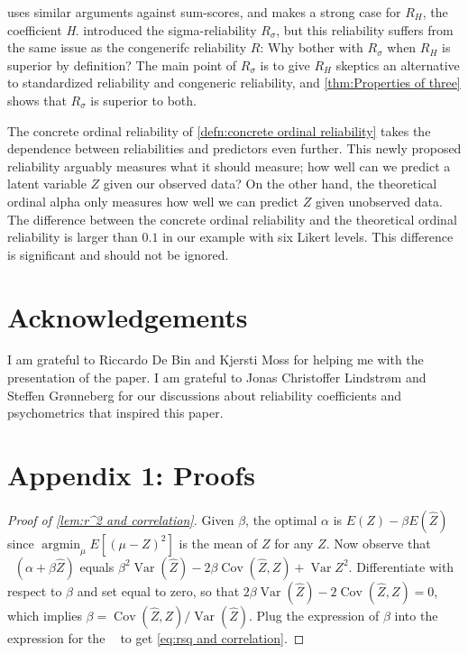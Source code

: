 \documentclass[twoside]{article}
\DeclareMathOperator{\Var}{Var}
\DeclareMathOperator{\argmin}{argmin}
\DeclareMathOperator{\Cov}{Cov}
\DeclareMathOperator{\MSE}{MSE_Z}
\begin{document}
\citet{McNeish2019-ea} uses similar arguments against sum-scores, and makes a strong case for $R_H$, the coefficient \textit{H}.  introduced the sigma-reliability $ R_\sigma$, but this reliability suffers from the same issue as the congenerifc reliability $R$: Why bother with $ R_\sigma$ when $R_H$ is superior by definition? The main point of $ R_\sigma$ is to give $ R_H$ skeptics an alternative to standardized reliability and congeneric reliability, and \cref{thm:Properties of three} shows that $ R_\sigma$ is superior to both. 

The concrete ordinal reliability of \cref{defn:concrete ordinal reliability} takes the dependence between reliabilities and predictors even further. This newly proposed reliability arguably measures what it should measure; how well can we predict a latent variable $Z$ given our observed data? On the other hand, the theoretical ordinal alpha only measures how well we can predict $Z$ given unobserved data. The difference between the concrete ordinal reliability and the theoretical ordinal reliability is larger than $0.1$ in our example with six Likert levels. This difference is significant and should not be ignored.

\section{Acknowledgements}
I am grateful to Riccardo De Bin and Kjersti Moss for helping me with the presentation of the paper. I am grateful to Jonas Christoffer Lindstrøm and Steffen Grønneberg for our discussions about reliability coefficients and psychometrics that inspired this paper.

\clearpage
\section*{Appendix 1: Proofs}
\label{Appendix 1}

\begin{proof}[Proof of \cref{lem:r^2 and correlation}]\label{proof:r^2 and correlation}
Given $\beta$, the optimal $\alpha$ is $E(Z) - \beta E(\hat{Z})$ since $\argmin_\mu E[(\mu-Z)^2]$ is the mean of $Z$ for any $Z$. Now observe that $\MSE(\alpha+\beta\hat{Z})$ equals $\beta^{2}\Var(\hat{Z})-2\beta\Cov(\hat{Z},Z)+\Var Z^{2}$.
Differentiate with respect to $\beta$ and set equal to zero, so that
$2\beta\Var(\hat{Z})-2\Cov(\hat{Z},Z)=0$, which implies $\beta=\Cov(\hat{Z},Z)/\Var(\hat{Z})$. Plug the expression of $\beta$ into the expression for the $\MSE$ to get \cref{eq:rsq and correlation}.
\end{proof}
\end{document}
